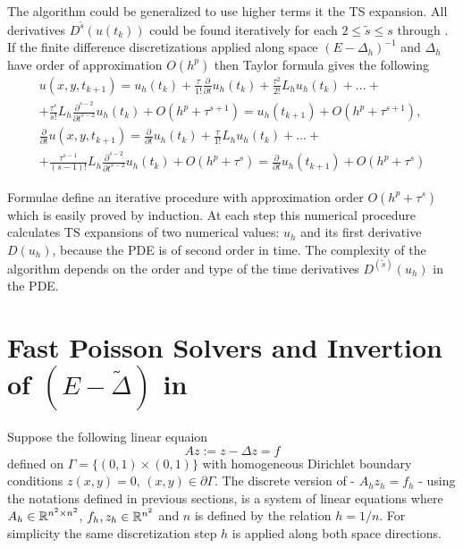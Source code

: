 \documentclass[11pt,a4paper,twoside]{article}
\begin{document}
The algorithm could be generalized to use higher terms it the TS expansion. All derivatives $D^{\tilde s}(u(t_k))$ could be found iteratively for each $2 \leq \tilde s \leq s$ through . If the finite difference discretizations applied along space $(E - \Delta_h)^{-1}$ and $\Delta_h$ have order of approximation $O(h^p)$ then Taylor formula gives the following
\begin{align} \label{GeneralIt}
u(x,y,t_{k+1}) = u_h(t_k) + \frac{\tau } {1!}  \frac{\partial}{\partial t} u_h(t_k) + \frac{ \tau^2} { 2!}L_h u_h(t_k) +... + \nonumber
\\ + \frac{\tau^s}{ s! }L_h \frac{\partial^{s-2}}{\partial t^{s-2}} u_h(t_k) + O(h^p + \tau^{s+1}) = u_h(t_{k+1}) + O(h^p + \tau^{s+1}), \nonumber
\\  \frac{\partial}{\partial t}u(x,y,t_{k+1}) = \frac{\partial}{\partial t} u_h(t_k) + \frac{\tau } {1!}  L_h u_h(t_k) + ... + \nonumber
\\ + \frac{\tau^{s-1}}{ (s-1)! } L_h \frac{\partial^{s-2} }{\partial t^{s-2}} u_h(t_k)  + O(h^p + \tau^s) = \frac{\partial}{\partial t}u_h(t_{k+1}) + O(h^p + \tau^s)
\end{align}

Formulae  define an iterative procedure with approximation order $O(h^p + \tau^s)$ which is easily proved by induction. At each step this numerical procedure calculates TS expansions of two numerical values: $u_h$ and its first derivative $D(u_h)$, because the PDE is of second order in time. The complexity of the algorithm depends on the order and type of the time derivatives $D^{(\tilde s)}(u_h)$ in the PDE.

\section{Fast Poisson Solvers and Invertion of $(E-\tilde \Delta)$ in }\label{FPSsection}
Suppose the following linear equaion
\begin{equation}\label{FPeq}
Az:=z-\Delta z = f
\end{equation}
defined on $\Gamma = \{ (0,1) \times (0,1) \}$ with homogeneous Dirichlet boundary conditions $z(x,y) = 0$, $(x,y) \in \partial \Gamma$. The discrete version of  - $A_h z_h = f_h$ - using the notations defined in previous sections, is a system of linear equations where $A_h \in \mathbb{R}^{n^2 \times n^2}$, $f_h, z_h \in \mathbb{R}^{n^2}$ and $n$ is defined by the relation $h=1/n$. For simplicity the same discretization step $h$ is applied along both space directions.
\end{document}
